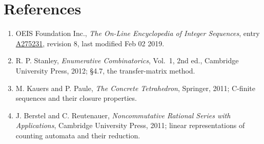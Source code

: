 \documentclass[11pt]{article}
\theoremstyle{definition}
\begin{document}
\section{References}

\begin{enumerate}

\item OEIS Foundation Inc., \emph{The On-Line Encyclopedia of Integer Sequences}, entry \href{https://oeis.org/A275231}{A275231}, revision 8, last modified Feb 02 2019.

\item R. P. Stanley, \emph{Enumerative Combinatorics}, Vol.~1, 2nd ed., Cambridge University Press, 2012; \S4.7, the transfer-matrix method.

\item M. Kauers and P. Paule, \emph{The Concrete Tetrahedron}, Springer, 2011; C-finite sequences and their closure properties.

\item J. Berstel and C. Reutenauer, \emph{Noncommutative Rational Series with Applications}, Cambridge University Press, 2011; linear representations of counting automata and their reduction.

\end{enumerate}
\end{document}
